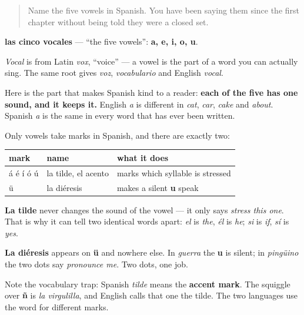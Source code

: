 \begin{quote}
Name the five vowels in Spanish. You have been saying them since the first chapter without being told they were a closed set.
\end{quote}

\begin{cousinweb}
\textbf{las cinco vocales} — \textquotedblleft{}the five vowels\textquotedblright{}: \textbf{a, e, i, o, u}.

\emph{Vocal} is from Latin \emph{vox}, \textquotedblleft{}voice\textquotedblright{} — a vowel is the part of a word you can actually sing. The same root gives \emph{voz}, \emph{vocabulario} and English \emph{vocal}.

Here is the part that makes Spanish kind to a reader: \textbf{each of the five has one sound, and it keeps it.} English \emph{a} is different in \emph{cat}, \emph{car}, \emph{cake} and \emph{about}. Spanish \emph{a} is the same in every word that has ever been written.
\end{cousinweb}

\begin{grammarlens}[title={Grammar Lens: the two marks a vowel can carry}]
Only vowels take marks in Spanish, and there are exactly two:

\noindent
\begin{tabularx}{\linewidth}{@{}>{\raggedright\arraybackslash}X>{\raggedright\arraybackslash}X>{\raggedright\arraybackslash}X@{}}
\toprule
\textbf{mark} & \textbf{name} & \textbf{what it does} \\
\midrule
á é í ó ú & la tilde, el acento & marks which syllable is stressed \\
ü & la diéresis & makes a silent \textbf{u} speak \\
\bottomrule
\end{tabularx}

\textbf{La tilde} never changes the sound of the vowel — it only says \emph{stress this one}. That is why it can tell two identical words apart: \emph{el} is \emph{the}, \emph{él} is \emph{he}; \emph{si} is \emph{if}, \emph{sí} is \emph{yes}.

\textbf{La diéresis} appears on \textbf{ü} and nowhere else. In \emph{guerra} the \textbf{u} is silent; in \emph{pingüino} the two dots say \emph{pronounce me}. Two dots, one job.

Note the vocabulary trap: Spanish \emph{tilde} means the \textbf{accent mark}. The squiggle over \textbf{ñ} is \emph{la virgulilla}, and English calls that one the tilde. The two languages use the word for different marks.
\end{grammarlens}

